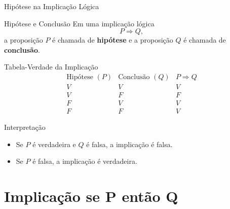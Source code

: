 \documentclass[9pt]{beamer}
\begin{document}
\begin{frame}{Hipótese na Implicação Lógica}
\small

\begin{block}{Hipótese e Conclusão}
Em uma implicação lógica
\[
P \Rightarrow Q,
\]
a proposição $P$ é chamada de \textbf{hipótese}
e a proposição $Q$ é chamada de \textbf{conclusão}.
\end{block}

\begin{block}{Tabela-Verdade da Implicação}
\[
\begin{array}{c|c|c}
\text{Hipótese } (P) & \text{Conclusão } (Q) & P \Rightarrow Q \\ \hline
V & V & V \\
V & F & F \\
F & V & V \\
F & F & V
\end{array}
\]
\end{block}

\begin{block}{Interpretação}
\begin{itemize}
    \item Se $P$ é verdadeira e $Q$ é falsa, a implicação é falsa.
    \item Se $P$ é falsa, a implicação é verdadeira.
\end{itemize}
\end{block}

\end{frame}

\section{Implicação se P então Q}
\end{document}

